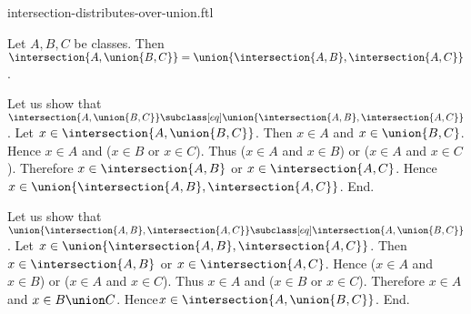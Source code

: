 \documentclass{article}
\begin{document}
\begin{smodule}[creators={Marcel Schütz}]{intersection-distributes-over-union.ftl}

  \begin{fproposition*}[label=3102749514268672]
    Let $A, B, C$ be classes.
    Then $\intersection{A,\union{B,C}} = \union{\intersection{A,B},\intersection{A,C}}$.
  \end{fproposition*}
  \begin{fproof}
    Let us show that $\intersection{A,\union{B,C}} \subclass[eq] \union{\intersection{A,B},\intersection{A,C}}$.
      Let $x \in \intersection{A,\union{B,C}}$.
      Then $x \in A$ and $x \in \union{B,C}$.
      Hence $x \in A$ and ($x \in B$ or $x \in C$).
      Thus ($x \in A$ and $x \in B$) or ($x \in A$ and $x \in C$).
      Therefore $x \in \intersection{A,B}$ or $x \in \intersection{A,C}$.
      Hence $x \in \union{\intersection{A,B},\intersection{A,C}}$.
    End.

    Let us show that $\union{\intersection{A,B},\intersection{A,C}} \subclass[eq] \intersection{A,\union{B,C}}$.
      Let $x \in \union{\intersection{A,B},\intersection{A,C}}$.
      Then $x \in \intersection{A,B}$ or $x \in \intersection{A,C}$.
      Hence ($x \in A$ and $x \in B$) or ($x \in A$ and $x \in C$).
      Thus $x \in A$ and ($x \in B$ or $x \in C$).
      Therefore $x \in A$ and $x \in B \union C$.
      Hence$ x \in \intersection{A,\union{B,C}}$.
    End.
  \end{fproof}
\end{smodule}
\end{document}
